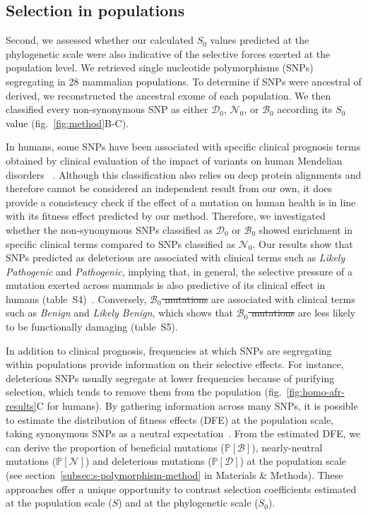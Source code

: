 \documentclass{article} %
\newcommand{\proba}{\mathbb{P}}
\newcommand{\Sphy}{S_{0}}
\newcommand{\SphyDel}{\mathcal{D}_0}
\newcommand{\SphyNeu}{\mathcal{N}_0}
\newcommand{\SphyBen}{\mathcal{B}_0}
\newcommand{\Spop}{S}
\newcommand{\SpopDel}{\mathcal{D}}
\newcommand{\SpopNeu}{\mathcal{N}}
\newcommand{\SpopBen}{\mathcal{B}}
\newcommand{\ProbaPopDel}{\proba [ \SpopDel]}
\newcommand{\ProbaPopNeu}{\proba [ \SpopNeu ]}
\newcommand{\ProbaPopBen}{\proba [ \SpopBen ]}
\providecommand{\DIFaddtex}[1]{{\protect\color{blue}\uwave{#1}}} %
\providecommand{\DIFdeltex}[1]{{\protect\color{red}\sout{#1}}}                      %
\providecommand{\DIFaddbegin}{} %
\providecommand{\DIFaddend}{} %
\providecommand{\DIFdelbegin}{} %
\providecommand{\DIFdelend}{} %
\providecommand{\DIFadd}[1]{\texorpdfstring{\DIFaddtex{#1}}{#1}} %
\providecommand{\DIFdel}[1]{\texorpdfstring{\DIFdeltex{#1}}{}} %
\newcommand{\DIFscaledelfig}{0.5}
\newlength{\DIFdelgraphicswidth} %
\newlength{\DIFdelgraphicsheight} %
\newcommand{\DIFaddincludegraphics}[2][]{{\color{blue}\fbox{\DIFOincludegraphics[#1]{#2}}}} %
\newcommand{\DIFdelincludegraphics}[2][]{%
\sbox{\DIFdelgraphicsbox}{\DIFOincludegraphics[#1]{#2}}%
\settoboxwidth{\DIFdelgraphicswidth}{\DIFdelgraphicsbox} %
\settoboxtotalheight{\DIFdelgraphicsheight}{\DIFdelgraphicsbox} %
\scalebox{\DIFscaledelfig}{%
\parbox[b]{\DIFdelgraphicswidth}{\usebox{\DIFdelgraphicsbox}\\[-\baselineskip] \rule{\DIFdelgraphicswidth}{0em}}\llap{\resizebox{\DIFdelgraphicswidth}{\DIFdelgraphicsheight}{%
\setlength{\unitlength}{\DIFdelgraphicswidth}%
\begin{picture}(1,1)%
\thicklines\linethickness{2pt} %
{\color[rgb]{1,0,0}\put(0,0){\framebox(1,1){}}}%
{\color[rgb]{1,0,0}\put(0,0){\line( 1,1){1}}}%
{\color[rgb]{1,0,0}\put(0,1){\line(1,-1){1}}}%
\end{picture}%
}\hspace*{3pt}}} %
} %
\DeclareRobustCommand{\DIFaddbegin}{\DIFOaddbegin \let\includegraphics\DIFaddincludegraphics} %
\DeclareRobustCommand{\DIFaddend}{\DIFOaddend \let\includegraphics\DIFOincludegraphics} %
\DeclareRobustCommand{\DIFdelbegin}{\DIFOdelbegin \let\includegraphics\DIFdelincludegraphics} %
\DeclareRobustCommand{\DIFdelend}{\DIFOaddend \let\includegraphics\DIFOincludegraphics} %
\begin{document}
    \subsection*{Selection in populations}
    Second, we assessed whether our calculated $\Sphy$ values predicted at the phylogenetic scale were also indicative of the selective forces exerted at the population level.
    We retrieved single nucleotide polymorphisms (SNPs) segregating in 28 mammalian populations.
    To determine if SNPs were ancestral of derived, we reconstructed the ancestral exome of each population.
    We then classified every non-synonymous SNP as either $\SphyDel$, $\SphyNeu$, or $\SphyBen$ according its $\Sphy$ value (fig.~\ref{fig:method}B-C).

    In humans, some SNPs have been associated with specific clinical prognosis terms obtained by clinical evaluation of the impact of variants on human Mendelian disorders ~\cite{landrum_clinvar_2018}.
    Although this classification also relies on deep protein alignments and therefore cannot be considered an independent result from our own, it does provide a consistency check if the effect of a mutation on human health is in line with its fitness effect predicted by our method.
    Therefore, we investigated whether the non-synonymous SNPs classified as $\SphyDel$ or $\SphyBen$ showed enrichment in specific clinical terms compared to SNPs classified as $\SphyNeu$.
    Our results show that SNPs predicted as deleterious are associated with clinical terms such as \textit{Likely Pathogenic} and \textit{Pathogenic}, implying that, in general, the selective pressure of a mutation exerted across mammals is also predictive of its clinical effect in humans (table~S4)~\cite{sullivan_leveraging_2023}.
    Conversely, \DIFdelbegin \DIFdel{$\SphyBen$ mutations }\DIFdelend \DIFaddbegin \DIFadd{back-mutations }\DIFaddend are associated with clinical terms such as \textit{Benign} and \textit{Likely Benign}, which shows that \DIFdelbegin \DIFdel{$\SphyBen$ mutations }\DIFdelend \DIFaddbegin \DIFadd{back-mutations }\DIFaddend are less likely to be functionally damaging (table~S5).

    In addition to clinical prognosis, frequencies at which SNPs are segregating within populations provide information on their selective effects.
    For instance, deleterious SNPs usually segregate at lower frequencies because of purifying selection, which tends to remove them from the population (fig.~\ref{fig:homo-afr-results}C for humans).
    By gathering information across many SNPs, it is possible to estimate the distribution of fitness effects (DFE) at the population scale, taking synonymous SNPs as a neutral expectation~\cite{eyre-walker_distribution_2006, eyre-walker_estimating_2009, galtier_adaptive_2016, tataru_inference_2017}.
    From the estimated DFE, we can derive the proportion of beneficial mutations ($\ProbaPopBen$), nearly-neutral mutations ($\ProbaPopNeu$) and deleterious mutations ($\ProbaPopDel$) at the population scale (see section~\ref{subsec:s-polymorphism-method} in Materials \& Methods).
    These approaches offer a unique opportunity to contrast selection coefficients estimated at the population scale ($\Spop$) and at the phylogenetic scale ($\Sphy$).
\end{document}
